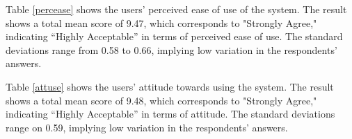 \documentclass[12pt,a4paper,]{article}
\begin{document}
	Table \ref{percease} shows the users’ perceived ease of use of the system. The result shows a total mean score of 9.47, which corresponds to "Strongly Agree," indicating “Highly Acceptable” in terms of perceived ease of use. The standard deviations range from 0.58 to 0.66, implying low variation in the respondents’ answers.
	
	\begin{table}[h!]
		\centering
		\caption{Attitude Towards Using Evaluation}
		\label{attuse}
		\renewcommand{\arraystretch}{1.2}
	\end{table}
	
	Table \ref{attuse} shows the users’ attitude towards using the system. The result shows a total mean score of 9.48, which corresponds to "Strongly Agree," indicating “Highly Acceptable” in terms of attitude. The standard deviations range on 0.59, implying low variation in the respondents’ answers.
	
	
	\begin{table}[h!]
		\centering
		\caption{Behavioral Intention to Use Evaluation}
		\label{behint}
		\renewcommand{\arraystretch}{1.2}
	\end{table}
	
\end{document}

